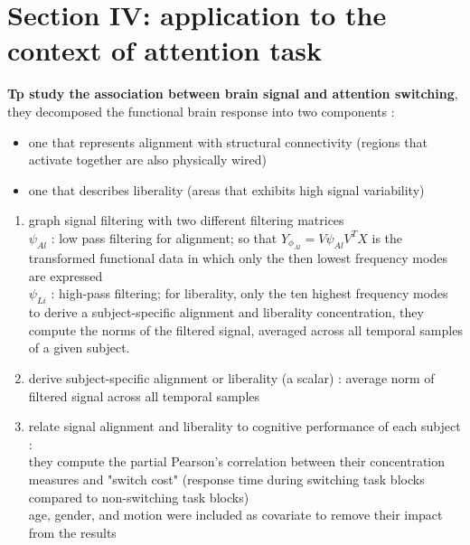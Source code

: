 \documentclass[12pt]{article}
\begin{document}
\section{Section IV: application to the context of attention task}
\textbf{Tp study the association between brain signal and attention switching}, they decomposed the functional brain response into two components : 
\begin{itemize}
    \item one that represents alignment with structural connectivity (regions that activate together are also physically wired)
    \item one that describes liberality (areas that exhibits high signal variability)
\end{itemize}
\begin{enumerate}
    \item graph signal filtering with two different filtering matrices \\
            $\psi_{Al}$ : low pass filtering for alignment; so that $Y_{\phi_{Al}} = V\psi_{Al}V^TX$ is the transformed functional data in which only the then lowest frequency modes are expressed \\
            $\psi_{Li}$ : high-pass filtering; for liberality, only the ten highest frequency modes \\ 
            to derive a subject-specific alignment and liberality concentration, they compute the norms of the filtered signal, averaged across all temporal samples of a given subject. 
    \item derive subject-specific alignment or liberality (a scalar) : average norm of filtered signal across all temporal samples
    \item relate signal alignment and liberality to cognitive performance of each subject : \\
            they compute the partial Pearson's correlation between their concentration measures and "switch cost" (response time during switching task blocks compared to non-switching task blocks) \\ 
            age, gender, and motion were included as covariate to remove their impact from the results  
\end{enumerate}
\end{document}
